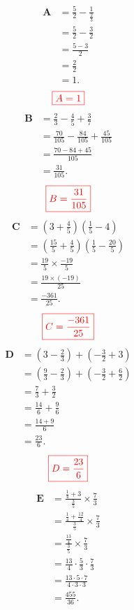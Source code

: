 \documentclass[12pt,a4paper]{article}
\begin{document}
\begin{align*}
\textbf{A} &= \frac{5}{2} - \frac{1}{\frac{2}{3}} \\ 
           &= \frac{5}{2} - \frac{3}{2} \\ 
           &= \frac{5 - 3}{2} \\ 
           &= \frac{2}{2} \\ 
           &= 1. 
\end{align*} 
$$\textcolor{red}{\boxed{A=1}}$$
\begin{align*}
\textbf{B} &= \frac{2}{3} - \frac{4}{5} + \frac{3}{7} \\ 
           &= \frac{70}{105} - \frac{84}{105} + \frac{45}{105} \\ 
           &= \frac{70 - 84 + 45}{105} \\ 
           &= \frac{31}{105}.
\end{align*} 
$$\textcolor{red}{\boxed{B=\frac{31}{105}}}$$
\begin{align*}
\textbf{C} &= \left(3 + \frac{4}{5} \right) \left(\frac{1}{5} - 4 \right) \\ 
           &= \left(\frac{15}{5} + \frac{4}{5} \right) \left(\frac{1}{5} - \frac{20}{5} \right) \\ 
           &= \frac{19}{5} \times \frac{-19}{5} \\ 
           &= \frac{19 \times (-19)}{25} \\ 
           &= \frac{-361}{25}.
\end{align*} 
$$\textcolor{red}{\boxed{C=\frac{-361}{25}}}$$
\begin{align*}
\textbf{D} &= \left(3 - \frac{2}{3} \right) + \left(-\frac{3}{2} + 3 \right) \\ 
           &= \left(\frac{9}{3} - \frac{2}{3} \right) + \left(-\frac{3}{2} + \frac{6}{2} \right) \\ 
           &= \frac{7}{3} + \frac{3}{2} \\ 
           &= \frac{14}{6} + \frac{9}{6} \\ 
           &= \frac{14 + 9}{6} \\ 
           &= \frac{23}{6}.
\end{align*}
$$\textcolor{red}{\boxed{D=\frac{23}{6}}}$$
\begin{align*}
\textbf{E} &= \frac{\frac{1}{4} + 3}{\frac{3}{5}} \times \frac{7}{3} \\ 
           &= \frac{\frac{1}{4} + \frac{12}{4}}{\frac{3}{5}} \times \frac{7}{3} \\ 
           &= \frac{\frac{13}{4}}{\frac{3}{5}} \times \frac{7}{3} \\ 
           &= \frac{13}{4} \cdot \frac{5}{3} \cdot \frac{7}{3} \\ 
           &= \frac{13 \cdot 5 \cdot 7}{4 \cdot 3 \cdot 3} \\ 
           &= \frac{455}{36}.
\end{align*}
\end{document}
